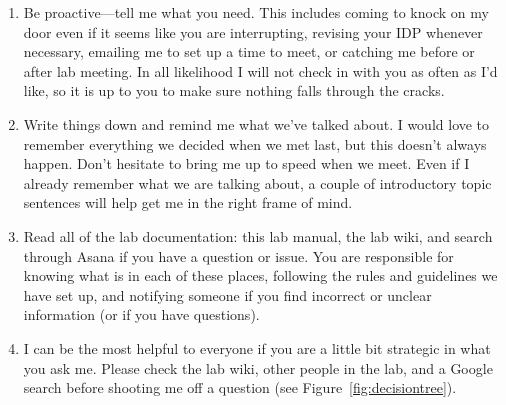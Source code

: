 \documentclass[letterpaper,12pt,oneside]{memoir}
\begin{document}
\begin{enumerate}
\item Be proactive---tell me what you need. This includes coming to knock on my door even if it seems like you are interrupting, revising your IDP whenever necessary, emailing me to set up a time to meet, or catching me before or after lab meeting. In all likelihood I will not check in with you as often as I'd like, so it is up to you to make sure nothing falls through the cracks.
\item Write things down and remind me what we've talked about. I would love to remember everything we decided when we met last, but this doesn't always happen. Don't hesitate to bring me up to speed when we meet. Even if I already remember what we are talking about, a couple of introductory topic sentences will help get me in the right frame of mind.
\item Read all of the lab documentation: this lab manual, the lab wiki, and search through Asana if you have a question or issue. You are responsible for knowing what is in each of these places, following the rules and guidelines we have set up, and notifying someone if you find incorrect or unclear information (or if you have questions).
\item I can be the most helpful to everyone if you are a little bit strategic in what you ask me. Please check the lab wiki, other people in the lab, and a Google search before shooting me off a question (see Figure~\ref{fig:decisiontree}).
\end{enumerate}
\end{document}
